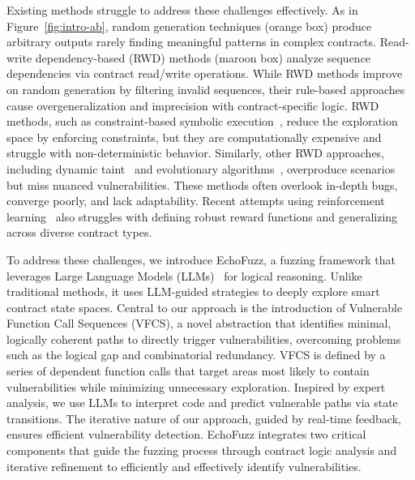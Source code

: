 \documentclass[sigconf]{acmart}
\newcommand{\PP}[1]{
\vspace{2px}
\noindent{\bf \IfEndWith{#1}{.}{#1}{#1.}}
}
\newcommand{\ToolName}{\textcolor{ToolNameColor}{\textsf{{EchoFuzz}}}}
\begin{document}
\begin{sloppypar}
Existing methods struggle to address these challenges effectively.
As in Figure~\ref{fig:intro-ab}, random generation techniques (orange box) produce arbitrary outputs rarely finding meaningful patterns in complex contracts.
Read-write dependency-based (RWD) methods (maroon box) analyze sequence dependencies via contract read/write operations.
While RWD methods improve on random generation by filtering invalid sequences, their rule-based approaches cause overgeneralization and imprecision with contract-specific logic.
RWD methods, such as constraint-based symbolic execution~\cite{torres2021confuzzius}, reduce the exploration space by enforcing constraints, but they are computationally expensive and struggle with non-deterministic behavior.
Similarly, other RWD approaches, including dynamic taint~\cite{ji2023seqfuzz} and evolutionary algorithms~\cite{li2024evofuzzer}, overproduce scenarios but miss nuanced vulnerabilities. 
These methods often overlook in-depth bugs, converge poorly, and lack adaptability. 
Recent attempts using reinforcement learning~\cite{su2022effectively} also struggles with defining robust reward functions and generalizing across diverse contract types.


%


\PP{Our Approach.}
To address these challenges, we introduce \ToolName{}, 
%
a fuzzing framework that leverages Large Language Models (LLMs)~\cite{zhao2023survey} for logical reasoning.
Unlike traditional methods, 
%
it uses LLM-guided strategies to deeply explore smart contract state spaces.
Central to our approach is the introduction of Vulnerable Function Call Sequences (VFCS), a novel abstraction that identifies minimal, logically coherent paths to directly trigger vulnerabilities, overcoming problems such as the logical gap and combinatorial redundancy. VFCS is defined by a series of dependent function calls that target areas most likely to contain vulnerabilities while minimizing unnecessary exploration. Inspired by expert analysis, we use LLMs to interpret code and predict vulnerable paths via state transitions. The iterative nature of our approach, guided by real-time feedback, ensures efficient vulnerability detection. \ToolName{} integrates two critical components that guide the fuzzing process through contract logic analysis and iterative refinement to efficiently and effectively identify vulnerabilities.





\end{sloppypar}
\end{document}
